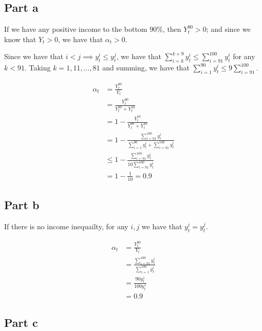 \documentclass[12pt,letterpaper]{article}
\theoremstyle{definition}
\begin{document}


\subsection*{Part a}

If we have any positive income to the bottom $90\%$, then $Y_t^{90} > 0$; and
since we know that $Y_t > 0$, we have that $\alpha_t > 0$.

Since we have that $i < j \implies y_t^i \leq y_t^j$, we have that
$\sum_{i=k}^{k+9}y_t^i \leq \sum_{i=91}^{100}y_t^i$ for any $k < 91$. Taking $k
= 1, 11, ..., 81$ and summing, we have that $\sum_{i=1}^{90}y_t^i \leq
9\sum_{i=91}^{100}$.

\begin{align*}
  \alpha_t &= \frac{Y_t^{90}}{Y_t} \\ 
           &= \frac{Y_t^{90}}{Y_t^{90} + Y_t^{10}} \\
           &= 1 - \frac{Y_t^{10}}{Y_t^{90} + Y_t^{10}} \\
           &= 1 - \frac{\sum_{i=91}^{100}y_t^i}{\sum_{i=1}^{90}y_t^i + \sum_{i=91}^{100}y_t^i} \\
           &\leq 1 - \frac{\sum_{i=91}^{100}y_t^i}{10\sum_{i=91}^{100}y_t^i} \\
           &= 1 - \frac{1}{10} = 0.9
\end{align*}

\subsection*{Part b}

If there is no income inequailty, for any $i,j$ we have that $y_t^i = y_t^j$.

\begin{align*}
  \alpha_t &= \frac{Y_t^{90}}{Y_t} \\ 
           &= \frac{\sum_{i=91}^{100}y_t^i}{\sum_{i=1}^{100}y_t^i} \\
           &= \frac{90y_t^1}{100y_t^1} \\
           &= 0.9
\end{align*}

\subsection*{Part c}
\end{document}
